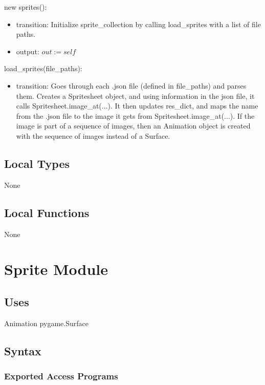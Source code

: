 \documentclass[12pt]{article}
\begin{document}
new sprites():
\begin{itemize}
    \item transition: Initialize sprite\_collection by calling load\_sprites with a list of file paths.
    \item output: $out := self$
\end{itemize}

load\_sprites(file\_paths):
\begin{itemize}
    \item transition: Goes through each .json file (defined in file\_paths) and parses them. Creates a Spritesheet object, and using information in the json file, it calls Spritesheet.image\_at(...). It then updates res\_dict, and maps the name from the .json file to the image it gets from Spritesheet.image\_at(...). If the image is part of a sequence of images, then an Animation object is created with the sequence of images instead of a Surface.
    
\end{itemize}

\subsection* {Local Types}

None

\subsection* {Local Functions}

None

\newpage

\section* {Sprite Module}

\subsection* {Uses}

Animation
pygame.Surface

\subsection* {Syntax}

\subsubsection* {Exported Access Programs}
\end{document}

